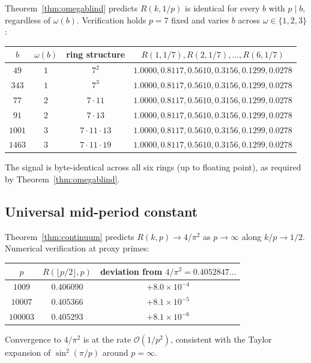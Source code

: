 \documentclass[11pt,reqno]{amsart}
\theoremstyle{plain}
\theoremstyle{definition}
\theoremstyle{remark}
\newcommand{\bigO}{\mathcal{O}}
\begin{document}
Theorem~\ref{thm:omegablind} predicts $R(k, 1/p)$ is identical for
every $b$ with $p \mid b$, regardless of $\omega(b)$. Verification
holds $p = 7$ fixed and varies $b$ across $\omega \in \{1, 2, 3\}$:
\begin{center}
\begin{tabular}{c|c|c|c}
\toprule
$b$    & $\omega(b)$ & ring structure         & $R(1, 1/7), R(2, 1/7), \ldots, R(6, 1/7)$ \\
\midrule
$49$   & $1$ & $7^2$        & $1.0000, 0.8117, 0.5610, 0.3156, 0.1299, 0.0278$ \\
$343$  & $1$ & $7^3$        & $1.0000, 0.8117, 0.5610, 0.3156, 0.1299, 0.0278$ \\
$77$   & $2$ & $7 \cdot 11$ & $1.0000, 0.8117, 0.5610, 0.3156, 0.1299, 0.0278$ \\
$91$   & $2$ & $7 \cdot 13$ & $1.0000, 0.8117, 0.5610, 0.3156, 0.1299, 0.0278$ \\
$1001$ & $3$ & $7 \cdot 11 \cdot 13$ & $1.0000, 0.8117, 0.5610, 0.3156, 0.1299, 0.0278$ \\
$1463$ & $3$ & $7 \cdot 11 \cdot 19$ & $1.0000, 0.8117, 0.5610, 0.3156, 0.1299, 0.0278$ \\
\bottomrule
\end{tabular}
\end{center}
The signal is byte-identical across all six rings (up to floating
point), as required by Theorem~\ref{thm:omegablind}.

\subsection{Universal mid-period constant}

Theorem~\ref{thm:continuum} predicts $R(k, p) \to 4/\pi^2$ as
$p \to \infty$ along $k / p \to 1/2$. Numerical verification at
proxy primes:
\begin{center}
\begin{tabular}{c|c|c}
\toprule
$p$   & $R(\lfloor p / 2 \rfloor, p)$ & deviation from $4/\pi^2 = 0.4052847\ldots$ \\
\midrule
$1009$    & $0.406090$ & $+8.0 \times 10^{-4}$ \\
$10007$   & $0.405366$ & $+8.1 \times 10^{-5}$ \\
$100003$  & $0.405293$ & $+8.1 \times 10^{-6}$ \\
\bottomrule
\end{tabular}
\end{center}
Convergence to $4/\pi^2$ is at the rate $\bigO(1/p^2)$, consistent
with the Taylor expansion of $\sin^2(\pi/p)$ around $p = \infty$.
\end{document}

